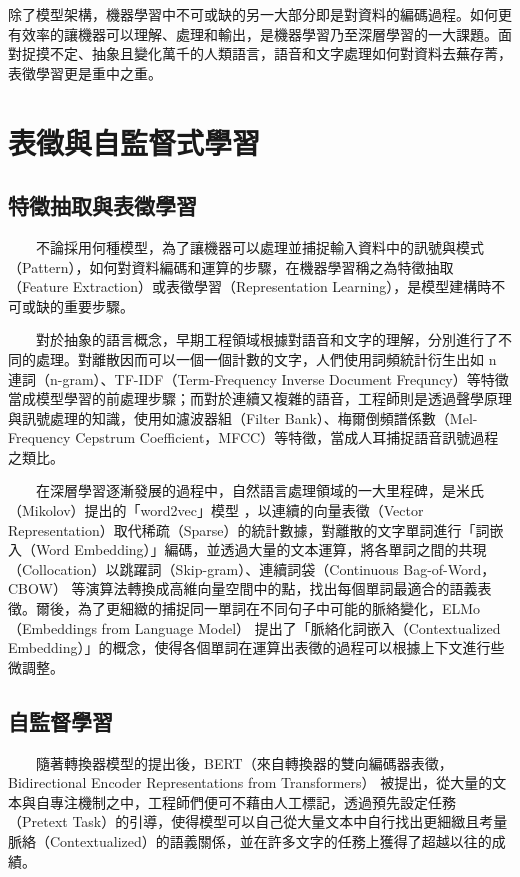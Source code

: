 除了模型架構，機器學習中不可或缺的另一大部分即是對資料的編碼過程。如何更有效率的讓機器可以理解、處理和輸出，是機器學習乃至深層學習的一大課題。面對捉摸不定、抽象且變化萬千的人類語言，語音和文字處理如何對資料去蕪存菁，表徵學習更是重中之重。

\section{表徵與自監督式學習}

\subsection{特徵抽取與表徵學習 }

　　不論採用何種模型，為了讓機器可以處理並捕捉輸入資料中的訊號與模式（Pattern），如何對資料編碼和運算的步驟，在機器學習稱之為特徵抽取（Feature Extraction）或表徵學習（Representation Learning），是模型建構時不可或缺的重要步驟。

　　對於抽象的語言概念，早期工程領域根據對語音和文字的理解，分別進行了不同的處理。對離散因而可以一個一個計數的文字，人們使用詞頻統計衍生出如 n 連詞（n-gram）、TF-IDF（Term-Frequency Inverse Document Frequncy）等特徵當成模型學習的前處理步驟；而對於連續又複雜的語音，工程師則是透過聲學原理與訊號處理的知識，使用如濾波器組（Filter Bank）、梅爾倒頻譜係數（Mel-Frequency Cepstrum Coefficient，MFCC）等特徵，當成人耳捕捉語音訊號過程之類比。

　　在深層學習逐漸發展的過程中，自然語言處理領域的一大里程碑，是米氏（Mikolov）提出的「word2vec」模型 \cite{mikolov_efficient_2013}，以連續的向量表徵（Vector Representation）取代稀疏（Sparse）的統計數據，對離散的文字單詞進行「詞嵌入（Word Embedding）」編碼，並透過大量的文本運算，將各單詞之間的共現（Collocation）以跳躍詞（Skip-gram）、連續詞袋（Continuous Bag-of-Word，CBOW） 等演算法轉換成高維向量空間中的點，找出每個單詞最適合的語義表徵。爾後，為了更細緻的捕捉同一單詞在不同句子中可能的脈絡變化，ELMo（Embeddings from Language Model）\cite{peters_deep_2018} 提出了「脈絡化詞嵌入（Contextualized Embedding）」的概念，使得各個單詞在運算出表徵的過程可以根據上下文進行些微調整。

\subsection{自監督學習}

　　隨著轉換器模型的提出後，BERT（來自轉換器的雙向編碼器表徵，Bidirectional Encoder Representations from Transformers）\cite{devlin_bert_2019} 被提出，從大量的文本與自專注機制之中，工程師們便可不藉由人工標記，透過預先設定任務（Pretext Task）的引導，使得模型可以自己從大量文本中自行找出更細緻且考量脈絡（Contextualized）的語義關係，並在許多文字的任務上獲得了超越以往的成績。

